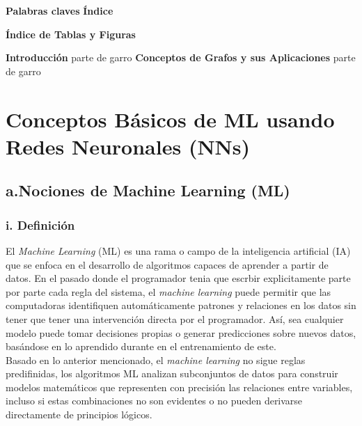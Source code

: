 \documentclass[11pt]{article} %
\begin{document}
\newpage
\thispagestyle{empty}
{\large \textbf{Palabras claves}}
\vspace{5pt}
\newpage
\thispagestyle{empty}
{\large \textbf{Índice}}
\vspace{5pt}

\newpage
\thispagestyle{empty}
{\large \textbf{Índice de Tablas y Figuras}}
\vspace{5pt}

\newpage
\thispagestyle{empty}
{\large \textbf{Introducción}}
\vspace{5pt}
parte de garro
\newpage
\thispagestyle{empty}
{\large \textbf{Conceptos de Grafos y sus Aplicaciones}}
\vspace{5pt}
parte de garro
\newpage
{\section*{Conceptos Básicos de ML usando Redes Neuronales (NNs)}} \vspace{10pt}

\subsection*{a.Nociones de Machine Learning (ML)}
\vspace{5pt}

\subsubsection*{i. Definición} 
\vspace{3pt}
El \textit{Machine Learning} (ML) es una rama o campo de la inteligencia artificial (IA) que se enfoca en el desarrollo de algoritmos capaces de aprender a partir de datos. En el pasado donde el programador tenia que escrbir explicitamente parte por parte cada regla del sistema, el \textit{machine learning} puede permitir que las computadoras identifiquen automáticamente patrones y relaciones en los datos sin tener que tener una intervención directa por el programador. Así, sea cualquier modelo puede tomar decisiones propias o generar predicciones sobre nuevos datos, basándose en lo aprendido durante en el entrenamiento de este. \\[3pt]
Basado en lo anterior mencionado, el \textit{machine learning} no sigue reglas predifinidas, los algoritmos ML analizan subconjuntos de datos para construir modelos matemáticos que representen con precisión las relaciones entre variables, incluso si estas combinaciones no son evidentes o no pueden derivarse directamente de principios lógicos.
\end{document}
